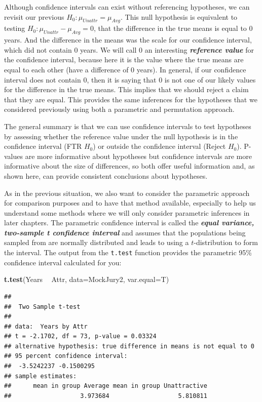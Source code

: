 \documentclass[]{book}
\newenvironment{Shaded}{\begin{snugshade}}{\end{snugshade}}
\newcommand{\KeywordTok}[1]{\textcolor[rgb]{0.13,0.29,0.53}{\textbf{#1}}}
\newcommand{\DataTypeTok}[1]{\textcolor[rgb]{0.13,0.29,0.53}{#1}}
\newcommand{\StringTok}[1]{\textcolor[rgb]{0.31,0.60,0.02}{#1}}
\newcommand{\OperatorTok}[1]{\textcolor[rgb]{0.81,0.36,0.00}{\textbf{#1}}}
\newcommand{\NormalTok}[1]{#1}
\theoremstyle{definition}
\theoremstyle{definition}
\theoremstyle{remark}
\begin{document}
Although confidence intervals can exist without referencing hypotheses,
we can revisit our previous \(H_0: \mu_{Unattr} = \mu_{Avg}\). This null
hypothesis is equivalent to testing
\(H_0: \mu_{Unattr} - \mu_{Avg} = 0\), that the difference in the true
means is equal to 0 years. And the difference in the means was the scale
for our confidence interval, which did not contain 0 years. We will call
0 an interesting \textbf{\emph{reference value}} for the confidence
interval, because here it is the value where the true means are equal to
each other (have a difference of 0 years). In general, if our confidence
interval does not contain 0, then it is saying that 0 is not one of our
likely values for the difference in the true means. This implies that we
should reject a claim that they are equal. This provides the same
inferences for the hypotheses that we considered previously using both a
parametric and permutation approach.

The general summary is that we can use confidence intervals to test
hypotheses by assessing whether the reference value under the null
hypothesis is in the confidence interval (FTR \(H_0\)) or outside the
confidence interval (Reject \(H_0\)). P-values are more informative
about hypotheses but confidence intervals are more informative about the
size of differences, so both offer useful information and, as shown
here, can provide consistent conclusions about hypotheses.

As in the previous situation, we also want to consider the parametric
approach for comparison purposes and to have that method available,
especially to help us understand some methods where we will only
consider parametric inferences in later chapters. The parametric
confidence interval is called the \textbf{\emph{equal variance,
two-sample t confidence interval}} and assumes that the populations
being sampled from are normally distributed and leads to using a
\(t\)-distribution to form the interval. The output from the
\texttt{t.test} function provides the parametric 95\% confidence
interval calculated for you:

\begin{Shaded}
\begin{Highlighting}[]
\KeywordTok{t.test}\NormalTok{(Years }\OperatorTok{~}\StringTok{ }\NormalTok{Attr, }\DataTypeTok{data=}\NormalTok{MockJury2, }\DataTypeTok{var.equal=}\NormalTok{T)}
\end{Highlighting}
\end{Shaded}

\begin{verbatim}
## 
##  Two Sample t-test
## 
## data:  Years by Attr
## t = -2.1702, df = 73, p-value = 0.03324
## alternative hypothesis: true difference in means is not equal to 0
## 95 percent confidence interval:
##  -3.5242237 -0.1500295
## sample estimates:
##      mean in group Average mean in group Unattractive 
##                   3.973684                   5.810811
\end{verbatim}
\end{document}
